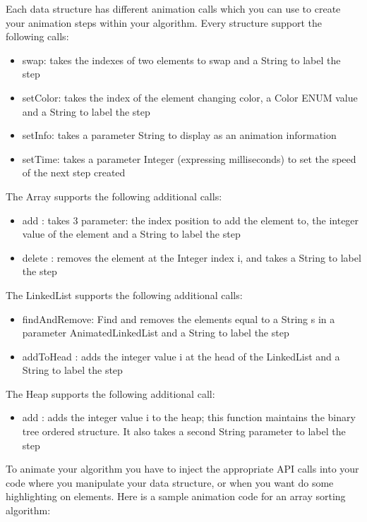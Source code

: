 \documentclass{l3proj}
\begin{document}
Each data structure has different animation calls which you can use to create your animation steps within your algorithm.
Every structure support the following calls:
\begin{itemize}
\item swap: takes the indexes of two elements to swap and a String to label the step
\item setColor: takes the index of the element changing color, a Color ENUM value and a String to label the step
\item setInfo: takes a parameter String to display as an animation information
\item setTime: takes a parameter Integer (expressing milliseconds) to set the speed of the next step created
\end{itemize}

The Array supports the following additional calls:
\begin{itemize}
\item add : takes 3 parameter: the index position to add the element to, the integer value of the element and a String to label the step
\item delete : removes the element at the Integer index i, and takes a String to label the step
\end{itemize}

The LinkedList supports the following additional calls:
\begin{itemize}
\item findAndRemove: Find and removes the elements equal to a String s in a parameter AnimatedLinkedList and a String to label the step
\item addToHead : adds the integer value i at the head of the LinkedList and a String to label the step
\end{itemize}

The Heap supports the following additional call:
\begin{itemize}
\item add : adds the integer value i to the heap; this function maintains the binary tree ordered structure. It also takes a second String parameter to label the step
\end{itemize}

To animate your algorithm you have to inject the appropriate API calls into your code where you manipulate your data structure, or when you want
do some highlighting on elements. Here is a sample animation code for an array sorting algorithm:


\end{document}

